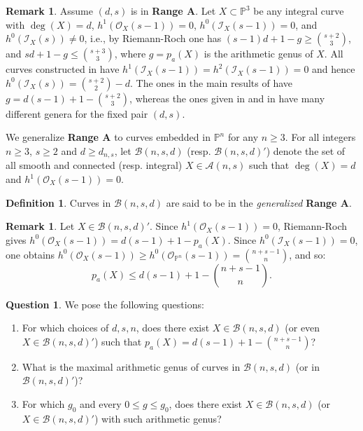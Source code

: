 \documentclass[a4, 11pt]{amsart}
\theoremstyle{plain}
\theoremstyle{definition}
\newtheorem{definition}[theorem]{Definition}
\newtheorem{remark}[theorem]{Remark}
\newtheorem{question}[theorem]{Question}
\newcommand{\enm}[1]{\ensuremath{#1}}          %
\newcommand{\cal}[1]{\mathcal{#1}}
\newcommand{\PP}{\enm{\mathbb{P}}}
\newcommand{\Aa}{\enm{\cal{A}}}
\newcommand{\Bb}{\enm{\cal{B}}}
\newcommand{\Ii}{\enm{\cal{I}}}
\newcommand{\Oo}{\enm{\cal{O}}}
\begin{document}
\begin{remark}\label{x3}
Assume $(d,s)$ is in {\bf Range A}. Let
$X\subset \PP^3$ be any integral curve with $\deg (X)=d$, $h^1(\Oo _X(s-1)) =0$, $h^0(\Ii _X(s-1)) =0$, and $h^0(\Ii _X(s))
\ne 0$, i.e., by Riemann-Roch one has $(s-1)d+1-g\ge \binom{s+2}{3}$, and $sd+1-g\le \binom{s+3}{3}$, where $g = p_a(X)$ is the arithmetic genus
of $X$. All curves constructed in \cite{bbem, be6, bef, fl1, fl2} have $h^1(\Ii _X(s-1)) = h^2(\Ii _X(s-1)) =0$ and hence $h^0(\Ii _X(s)) =\binom{s+2}{2} - d$. The ones in the main results of \cite{bbem, be6} have $g= d(s-1)+1-\binom{s+2}{3}$, whereas the ones given in \cite[Proposition 4.3]{bbem} and in \cite{bef}
have many different genera for the fixed pair $(d,s)$.
\end{remark}

We generalize {\bf Range A} to curves embedded in $\PP^n$ for any $n\geq 3$. For all integers $n\geq 3$, $s\ge 2$ and $d\ge d_{n,s}$, let $\Bb (n,s,d)$ (resp. $\Bb (n,s,d)'$) denote the set of all smooth and connected (resp. integral) $X\in \Aa (n,s)$ such that $\deg (X)=d$ and $h^1(\Oo _X(s-1)) = 0$.

\begin{definition}
Curves in $\Bb (n,s,d)$ are said to be in the {\it generalized} {\bf Range A}.
\end{definition}

\begin{remark}
Let $X\in \Bb (n,s,d)'$. Since $h^1(\Oo _X(s-1))  =0$, 
Riemann-Roch gives $h^0(\Oo _X(s-1)) =d(s-1)+1-p_a(X)$. Since $h^0(\Ii _X(s-1))=0$, one obtains $h^0(\Oo _X(s-1))\geq h^0(\Oo
_{\PP^n}(s-1)) =\binom{n+s-1}{n}$, and so: 
\[
p_a(X)\le d(s-1)+1-\binom{n+s-1}{n}.
\]
\end{remark}

\begin{question}\label{questiongeneralizedrangeA}
We pose the following questions:
\begin{enumerate}
\item[(i)] For which choices of $d, s, n$, does there exist $X\in \Bb (n,s,d)$ (or even $X\in \Bb (n,s,d)'$) such that $p_a(X) =d(s-1)+1-\binom{n+s-1}{n}$?
\item[(ii)] What is the maximal arithmetic genus of curves in $\Bb (n,s,d)$ (or in $\Bb (n,s,d)'$)?
\item[(iii)] For which $g_0$ and every $0\le g \le g_0$, does there exist $X\in \Bb (n,s,d)$ (or $X\in \Bb (n,s,d)'$) with such arithmetic genus? 
\end{enumerate}
\end{question}
\end{document}
